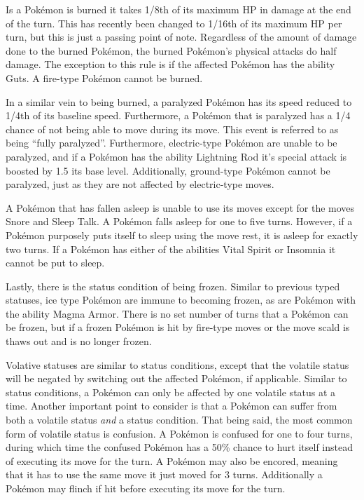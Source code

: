 \documentclass[12pt,twoside]{reedthesis}
\begin{document}
  Is a Pokémon is burned it takes 1/8th of its maximum HP in damage at the
  end of the turn. This has recently been changed to 1/16th of its maximum
  HP per turn, but this is just a passing point of note. Regardless of the
  amount of damage done to the burned Pokémon, the burned Pokémon's
  physical attacks do half damage. The exception to this rule is if the
  affected Pokémon has the ability Guts. A fire-type Pokémon cannot be
  burned.
  
  In a similar vein to being burned, a paralyzed Pokémon has its speed
  reduced to 1/4th of its baseline speed. Furthermore, a Pokémon that is
  paralyzed has a 1/4 chance of not being able to move during its move.
  This event is referred to as being ``fully paralyzed''. Furthermore,
  electric-type Pokémon are unable to be paralyzed, and if a Pokémon has
  the ability Lightning Rod it's special attack is boosted by 1.5 its base
  level. Additionally, ground-type Pokémon cannot be paralyzed, just as
  they are not affected by electric-type moves.
  
  A Pokémon that has fallen asleep is unable to use its moves except for
  the moves Snore and Sleep Talk. A Pokémon falls asleep for one to five
  turns. However, if a Pokémon purposely puts itself to sleep using the
  move rest, it is asleep for exactly two turns. If a Pokémon has either
  of the abilities Vital Spirit or Insomnia it cannot be put to sleep.
  
  Lastly, there is the status condition of being frozen. Similar to
  previous typed statuses, ice type Pokémon are immune to becoming frozen,
  as are Pokémon with the ability Magma Armor. There is no set number of
  turns that a Pokémon can be frozen, but if a frozen Pokémon is hit by
  fire-type moves or the move scald is thaws out and is no longer frozen.
  
  Volative statuses are similar to status conditions, except that the
  volatile status will be negated by switching out the affected Pokémon,
  if applicable. Similar to status conditions, a Pokémon can only be
  affected by one volatile status at a time. Another important point to
  consider is that a Pokémon can suffer from both a volatile status
  \emph{and} a status condition. That being said, the most common form of
  volatile status is confusion. A Pokémon is confused for one to four
  turns, during which time the confused Pokémon has a 50\% chance to hurt
  itself instead of executing its move for the turn. A Pokémon may also be
  encored, meaning that it has to use the same move it just moved for 3
  turns. Additionally a Pokémon may flinch if hit before executing its
  move for the turn.
  
\end{document}
